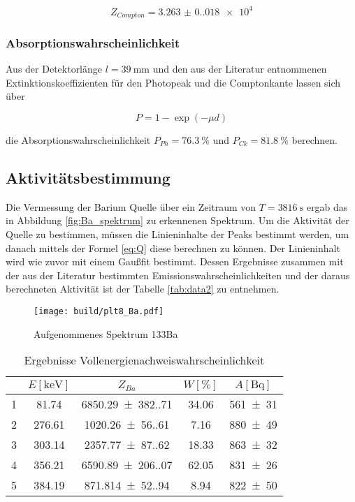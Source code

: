 \begin{equation*}
	Z_{Compton}=\num{3.263(0.018)e4}
\end{equation*}

\subsubsection{Absorptionswahrscheinlichkeit}
Aus der Detektorlänge $l=\qty{39}{\milli\meter}$ und den aus der Literatur
\cite{web:nist} entnommenen Extinktionskoeffizienten für den Photopeak und die
Comptonkante lassen sich über

\begin{equation}
	P=1-\exp(-\mu d)
	\label{eq:Absorption}
\end{equation}

die Absorptionswahrscheinlichkeit $P_{Ph}=\qty{76.3}{\%}$ und
$P_{Ck}=\qty{81.8}{\%}$ berechnen.

\subsection{Aktivitätsbestimmung}
Die Vermessung der Barium Quelle über ein Zeitraum von $T=\qty{3816}{\second}$
ergab das in Abbildung \eqref{fig:Ba_spektrum} zu erkennenen Spektrum. Um die
Aktivität der Quelle zu bestimmen, müssen die Linieninhalte der Peaks bestimmt
werden, um danach mittels der Formel \eqref{eq:Q} diese berechnen zu können. Der
Linieninhalt wird wie zuvor mit einem Gaußfit bestimmt. Dessen Ergebnisse
zusammen mit der aus der Literatur \cite{web:nuclear} bestimmten
Emissionswahrscheinlichkeiten und der daraus berechneten Aktivität ist der
Tabelle \eqref{tab:data2} zu entnehmen.

\begin{figure}[H]
	\centering
	\texttt{[image: build/plt8\_Ba.pdf]}
	\caption{Aufgenommenes Spektrum 133Ba}
	\label{fig:Ba_spektrum}
\end{figure}

\begin{table}[H]
	\centering
	\caption{Ergebnisse Vollenergienachweiswahrscheinlichkeit}
	\begin{tabular}{c c c c c}
		\toprule
		\text{Peak} & $ E [\unit{\kilo\eV}] $ & $ Z_{Ba} $            & $ W [\%] $  & $ A [\unit{\becquerel}] $ \\
		\midrule
		1           & \num{81.74}             & \num{6850.29(382.71)} & \num{34.06} & \num{561(31)}       \\
		2           & \num{276.61}            & \num{1020.26(56.61)}  & \num{7.16}  & \num{880(49)}       \\
		3           & \num{303.14}            & \num{2357.77(87.62)}  & \num{18.33} & \num{863(32)}       \\
		4           & \num{356.21}            & \num{6590.89(206.07)} & \num{62.05} & \num{831(26)}       \\
		5           & \num{384.19}            & \num{871.814(52.94)}  & \num{8.94}  & \num{822(50)}       \\
		\bottomrule
	\end{tabular}
	\label{tab:data2}
\end{table}

